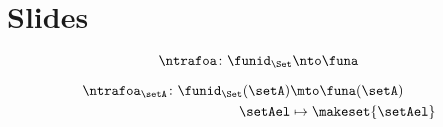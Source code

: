 
\section{Slides}


\begin{forslides}

  \begin{equation}
            \label{eq:ex_nt_1}
            \ntrafoa \colon \funid_\Set \nto \funa
        \end{equation}
        
        \begin{equation}
            \label{eq:ex_nt_2}
            \begin{aligned}
                \ntrafoa_\setA \colon \funid_\Set(\setA) & \mto \funa(\setA) \\
                \setAel                                  & \mapsto \makeset{\setAel}
            \end{aligned}
        \end{equation}
        
       
        
        
\end{forslides}
